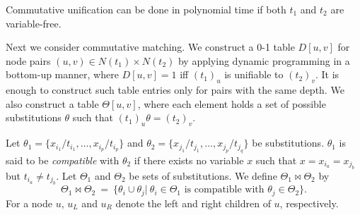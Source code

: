 \documentclass[a4paper]{llncs}
\begin{document}
\begin{proposition}
Commutative unification can be done in polynomial time
if both $t_1$ and $t_2$ are variable-free.
\end{proposition}

Next we consider commutative matching.
We construct a 0-1 table $D[u,v]$ for node pairs
$(u,v) \in N(t_1) \times N(t_2)$
by applying dynamic programming in a bottom-up manner,
where $D[u,v]=1$ iff $(t_1)_u$ is unifiable to $(t_2)_v$.
It is enough to construct such table entries only for pairs
with the same depth.
We also construct a table $\Theta[u,v]$, where each element
holds a set of possible substitutions $\theta$
such that $(t_1)_u \theta = (t_2)_v$.

Let $\theta_1 = \{x_{i_1}/t_{i_1},\ldots,x_{i_p}/t_{i_p} \}$ and
$\theta_2 = \{x_{j_1}/t_{j_1},\ldots,x_{j_p}/t_{j_q} \}$ be
substitutions.
$\theta_1$ is said to be \emph{compatible} with
$\theta_2$ if there exists no variable $x$ such that
$x = x_{i_a} = x_{j_b}$ but 
$t_{i_a} \neq t_{j_b}$.
Let $\Theta_1$ and $\Theta_2$ be sets of substitutions.
We define $\Theta_1 \Join \Theta_2$ by
\[
\Theta_1 \Join \Theta_2 ~=~  \{
\theta_i \cup \theta_j |~
\theta_i \in \Theta_1 \mbox{ is compatible with }
\theta_j \in \Theta_2 \}.
\]
For a node $u$, $u_L$ and $u_R$ denote the left and right children of
$u$, respectively.
\end{document}
